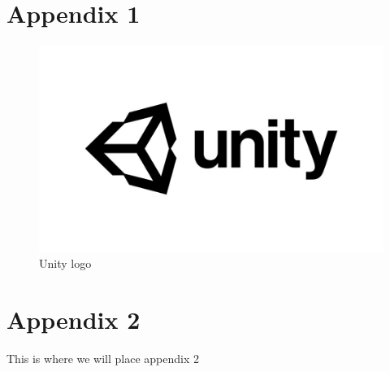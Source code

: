 \documentclass[titlepage]{article}
\begin{document}
    \section{Appendix 1}
        \begin{figure}[H]
        \centering
        \includegraphics[scale=0.2]{appendix/Unity.jpg}
        \caption{Unity logo}
        \label{fig:unity}
    \end{figure}

    \section{Appendix 2}
        This is where we will place appendix 2
\end{document}
